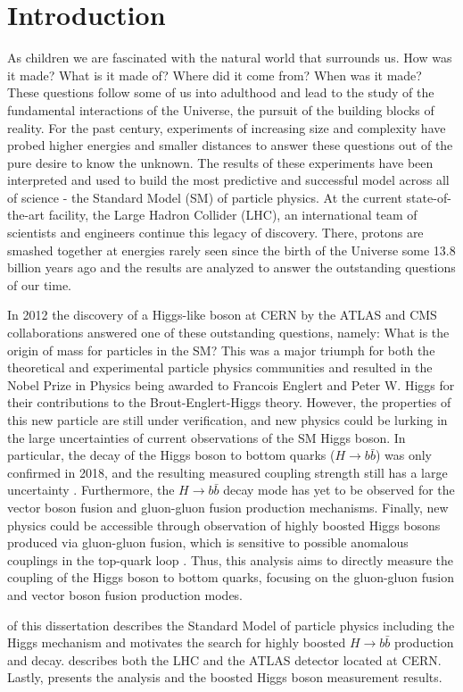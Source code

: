 \chapter{Introduction} \label{sec:intro}
As children we are fascinated with the natural world that surrounds us.  How
was it made? What is it made of? Where did it come from?  When was it made?
These questions follow some of us into adulthood and lead to the study of the
fundamental interactions of the Universe, the pursuit of the building blocks of
reality.  For the past century, experiments of increasing size and complexity
have probed higher energies and smaller distances to answer these questions out
of the pure desire to know the unknown.  The results of these experiments have
been interpreted and used to build the most predictive and successful model
across all of science - the Standard Model (SM) of particle physics. At the
current state-of-the-art facility, the Large Hadron Collider (LHC), an
international team of scientists and engineers continue this legacy of
discovery.  There, protons are smashed together at energies rarely seen since the
birth of the Universe some 13.8 billion years ago and the results are analyzed
to answer the outstanding questions of our time.

In 2012 the discovery of a Higgs-like boson \cite{Higgs:1964ia, Higgs:1964pj,
Higgs:1966ev, Englert:1964et, Guralnik:1964eu} at CERN by the ATLAS and CMS
\cite{Aad:2012tfa,Chatrchyan:2012xdj} collaborations answered one of these
outstanding questions, namely: What is the origin of mass for particles in the
SM?  This was a major triumph for both the theoretical and experimental
particle physics communities and resulted in the Nobel Prize in Physics being
awarded to Francois Englert and Peter W. Higgs for their contributions to the
Brout-Englert-Higgs theory. However, the properties of this new particle are
still under verification, and new physics could be lurking in the large
uncertainties of current observations of the SM Higgs boson.  In particular,
the decay of the Higgs boson to bottom quarks ($H \rightarrow b\bar{b}$) was
only confirmed in 2018, and the resulting measured coupling strength still has
a large uncertainty \cite{HIGG-2018-04, CMS:2018abb}. Furthermore, the $H
\rightarrow b\bar{b}$ decay mode has yet to be observed for the vector boson
fusion and gluon-gluon fusion production mechanisms.  Finally, new physics
could be accessible through observation of highly boosted Higgs bosons produced
via gluon-gluon fusion, which is sensitive to possible anomalous couplings in
the top-quark loop \cite{Grojean:2013nya, Schlaffer:2014osa}.  Thus, this
analysis aims to directly measure the coupling of the Higgs boson to bottom
quarks, focusing on the gluon-gluon fusion and vector boson fusion production
modes. 

 of this dissertation describes the Standard Model of
particle physics including the Higgs mechanism and motivates the search for
highly boosted $H \rightarrow b\bar{b}$ production and decay.
 describes both the LHC and the ATLAS detector located at
CERN. Lastly,  presents the analysis and the boosted
Higgs boson measurement results.
